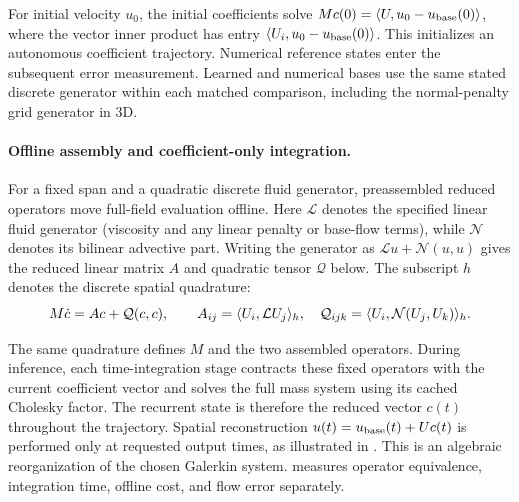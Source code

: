 For initial velocity $u_0$, the initial coefficients solve $M c(0)=\langle U,u_0-u_{\rm base}(0)\rangle$, where the vector inner product has entry $\langle U_i,u_0-u_{\rm base}(0)\rangle$. This initializes an autonomous coefficient trajectory. Numerical reference states enter the subsequent error measurement. Learned and numerical bases use the same stated discrete generator within each matched comparison, including the normal-penalty grid generator in 3D.

\paragraph{Offline assembly and coefficient-only integration.}
For a fixed span and a quadratic discrete fluid generator, {preassembled reduced operators \citep{treuille2006model,dewitt2012fluid,liu2015model} move full-field evaluation offline. Here $\mathcal L$ denotes the specified linear fluid generator (viscosity and any linear penalty or base-flow terms), while $\mathcal N$ denotes its bilinear advective part. Writing the generator as $\mathcal L u+\mathcal N(u,u)$ gives the reduced linear matrix $A$ and quadratic tensor $\mathcal Q$ below. The subscript $h$ denotes the discrete spatial quadrature:}
\begin{equation}
M\dot c=A c+\mathcal Q(c,c),\qquad
A_{ij}=\langle U_i,\mathcal L U_j\rangle_h,\quad
\mathcal Q_{ijk}=\langle U_i,\mathcal N(U_j,U_k)\rangle_h.
\label{eq:offline-rom}
\end{equation}

The same quadrature defines $M$ and the two assembled operators. During inference, each time-integration stage contracts these fixed operators with the current coefficient vector and solves the full mass system using its cached Cholesky factor. The recurrent state is therefore the reduced vector $c(t)$ throughout the trajectory. Spatial reconstruction $u(t)=u_{\rm base}(t)+Uc(t)$ is performed only at requested output times, as illustrated in . This is an algebraic reorganization of the chosen Galerkin system.  measures operator equivalence, integration time, offline cost, and flow error separately.
